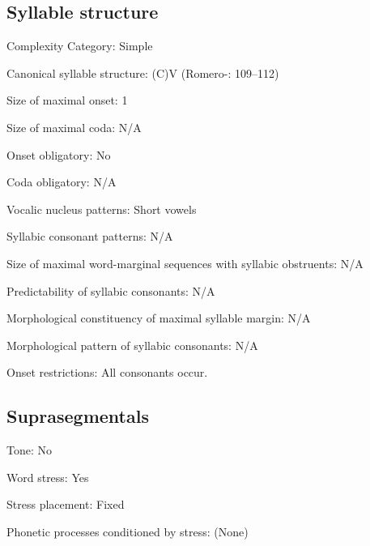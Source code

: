 {\subsection*{Syllable structure}
\begin{appendixdesc}

\item[Complexity Category:] Simple

\item[Canonical syllable structure:] (C)V (Romero-\citealt{Figeroa1997}: 109--112)

\item[Size of maximal onset:] 1

\item[Size of maximal coda:] N/A

\item[Onset obligatory:] No

\item[Coda obligatory:] N/A

\item[Vocalic nucleus patterns:] Short vowels

\item[Syllabic consonant patterns:] N/A

\item[Size of maximal word-marginal sequences with syllabic obstruents:] N/A

\item[Predictability of syllabic consonants:] N/A

\item[Morphological constituency of maximal syllable margin:] N/A

\item[Morphological pattern of syllabic consonants:] N/A

\item[Onset restrictions:] All consonants occur.
\end{appendixdesc}
\subsection*{Suprasegmentals}
\begin{appendixdesc}
\item[Tone:] No

\item[Word stress:] Yes

\item[Stress placement:] Fixed

\item[Phonetic processes conditioned by stress:] (None)


\end{appendixdesc}}
